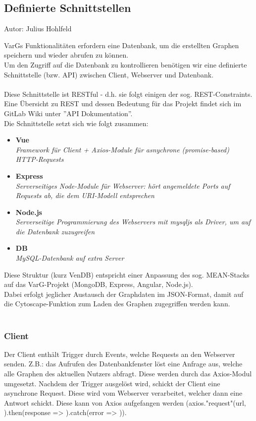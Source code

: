 \documentclass[twoside]{report}
\begin{document}
\subsection{Definierte Schnittstellen}
{\small Autor: Julius Hohlfeld}

VarGs Funktionalitäten erfordern eine Datenbank, um die erstellten Graphen speichern und wieder abrufen zu können.\\
Um den Zugriff auf die Datenbank zu kontrollieren benötigen wir eine definierte Schnittstelle (bzw. API) zwischen Client,
Webserver und Datenbank.\\
\\
Diese Schnittstelle ist RESTful - d.h. sie folgt einigen der sog. REST-Constraints. Eine Übersicht zu REST und dessen Bedeutung für das Projekt findet sich im GitLab Wiki unter ''API Dokumentation''.\\
Die Schnittstelle setzt sich wie folgt zusammen:
\begin{itemize}
  \item \textbf{Vue}
        \\\textit{Framework für Client + Axios-Module für asnychrone (promise-based) HTTP-Requests}
  \item  \textbf{Express}
        \\\textit{Serverseitiges Node-Module für Webserver: hört angemeldete Ports auf Requests ab, die dem URI-Modell entsprechen}
  \item \textbf{Node.js}
        \\\textit{Serverseitige Programmierung des Webservers mit mysqljs als Driver, um auf die Datenbank zuzugreifen}
  \item \textbf{DB}
        \\\textit{MySQL-Datenbank auf extra Server}
\end{itemize}

Diese Struktur (kurz VenDB) entspricht einer Anpassung des sog. MEAN-Stacks auf das VarG-Projekt (MongoDB, Express, Angular, Node.js).\\
Dabei erfolgt jeglicher Austausch der Graphdaten im JSON-Format, damit auf die Cytoscape-Funktion zum Laden des Graphen zugegriffen werden kann.\\
\\
\subsubsection{Client}

Der Client enthält Trigger durch Events, welche Requests an den Webserver senden. Z.B.: das Aufrufen des Datenbankfenster löst eine Anfrage aus, welche alle Graphen des aktuellen Nutzers abfragt.
Diese werden durch das Axios-Modul umgesetzt. Nachdem der Trigger ausgelöst wird, schickt der Client eine asynchrone Request. Diese wird vom Webserver verarbeitet, welcher dann eine Antwort schickt. Diese kann von Axios aufgefangen werden (axios."request"(url, {}).then(response => {}).catch(error => {})).
\end{document}
